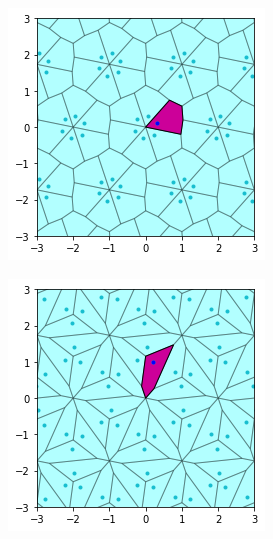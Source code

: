 \documentclass[11pt]{article}
\begin{document}
\begin{figure}[H]
\begin{subfigure}[b]{0.3\textwidth}
    \includegraphics[width=\textwidth]{output_13_0.png}
    \label{fig:f2}
  \end{subfigure}
  \begin{subfigure}[b]{0.3\textwidth}
    \includegraphics[width=\textwidth]{output_12_0.png}
    \label{fig:f3}
  \end{subfigure}
\end{figure}
\end{document}
